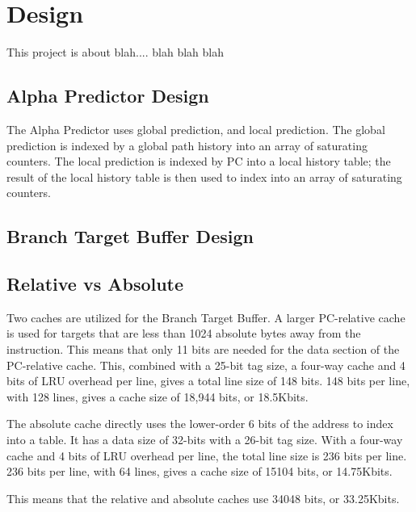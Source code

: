 \section{Design}
This project is about blah.... blah blah blah

\subsection{Alpha Predictor Design}
The Alpha Predictor uses global prediction, and local prediction. The global prediction is indexed by a global path history into an array of saturating counters. The local prediction is indexed by PC into a local history table; the result of the local history table is then used to index into an array of saturating counters.

\subsection{Branch Target Buffer Design}

\subsection{Relative vs Absolute}
Two caches are utilized for the Branch Target Buffer. A larger PC-relative cache is used for targets that are less than 1024 absolute bytes away from the instruction. This means that only 11 bits are needed for the data section of the PC-relative cache. This, combined with a 25-bit tag size, a four-way cache and 4 bits of LRU overhead per line, gives a total line size of 148 bits. 148 bits per line, with 128 lines, gives a cache size of 18,944 bits, or 18.5Kbits.

The absolute cache directly uses the lower-order 6 bits of the address to index into a table. It has a data size of 32-bits with a 26-bit tag size. With a four-way cache and 4 bits of LRU overhead per line, the total line size is 236 bits per line. 236 bits per line, with 64 lines, gives a cache size of 15104 bits, or 14.75Kbits.

This means that the relative and absolute caches use 34048 bits, or 33.25Kbits. 
